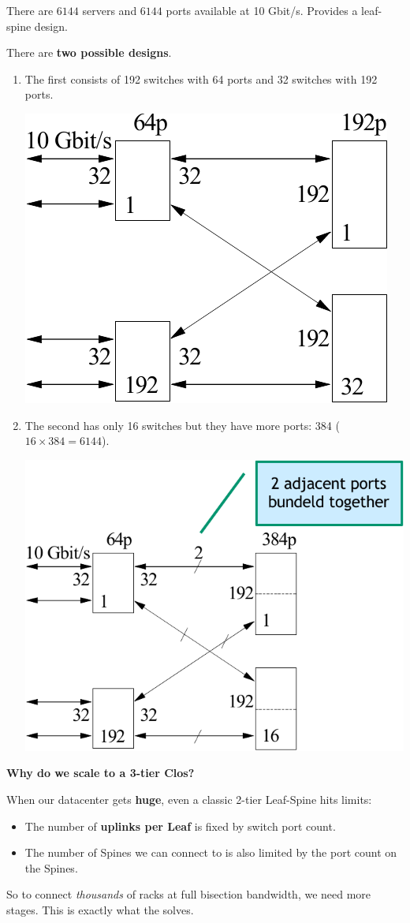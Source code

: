 \begin{examplebox}
    There are $6144$ servers and $6144$ ports available at 10 Gbit/s. Provides a leaf-spine design.

    There are \textbf{two possible designs}.
    \begin{enumerate}
        \item The first consists of 192 switches with 64 ports and 32 switches with 192 ports.
        \begin{center}
            \includegraphics[width=.4\textwidth]{img/networking-8.pdf}
        \end{center}
        
        \item The second has only 16 switches but they have more ports: 384 ($16 \times 384 = 6144$).
        \begin{center}
            \includegraphics[width=.5\textwidth]{img/networking-9.pdf}
        \end{center}
    \end{enumerate}
\end{examplebox}

\highspace
\begin{flushleft}
    \textcolor{Green3}{ \textbf{Why do we scale to a 3-tier Clos?}}
\end{flushleft}
When our datacenter gets \textbf{huge}, even a classic 2-tier Leaf-Spine hits limits:
\begin{itemize}
    \item The number of \textbf{uplinks per Leaf} is fixed by switch port count.
    \item The number of Spines we can connect to is also limited by the port count on the Spines.
\end{itemize}
So to connect \emph{thousands} of racks at full bisection bandwidth, we need more stages. This is exactly what the  solves.


